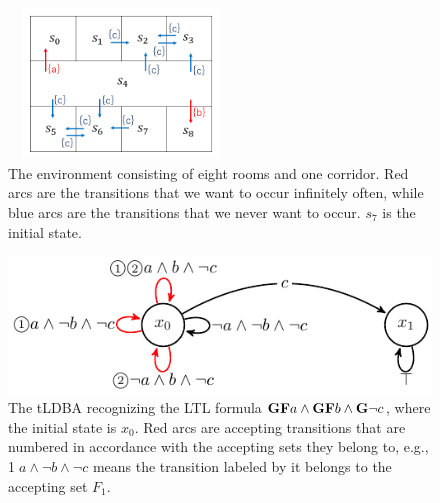 \documentclass[letterpaper, 10 pt, conference]{ieeeconf}  %
\begin{document}
\begin{figure}[bp]
    \centering
    \includegraphics[bb=0 0 377 290,height=4cm,width=6cm]{MDP_corridor.png}
    \caption{The environment consisting of eight rooms and one corridor. Red arcs are the transitions that we want to occur infinitely often, while blue arcs are the transitions that we never want to occur. $s_7$ is the initial state.}
    \label{Grid1}
\end{figure}

\begin{figure}[htbp]
   \centering
   \vspace{2mm}
   \includegraphics[bb=0 0 247 80,scale=0.85]{ldgba_original.pdf}
   \caption{The tLDBA recognizing the LTL formula $\text{{\bf GF}}a \wedge \text{{\bf GF}}b \wedge \text{{\bf G}}\neg c$, where the initial state is $x_0$. Red arcs are accepting transitions that are numbered in accordance with the accepting sets they belong to, e.g., \textcircled{\scriptsize 1}$a \land \neg b \land \neg c$ means the transition labeled by it belongs to the accepting set $F_1$.}
   \label{automaton}
\end{figure}
\end{document}
